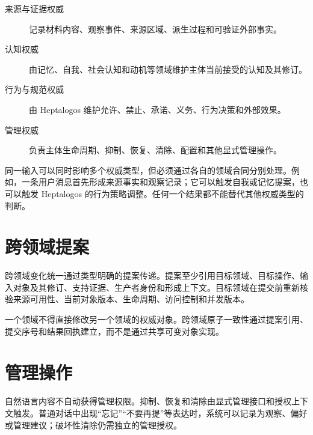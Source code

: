 \begin{description}
\item[来源与证据权威] 记录材料内容、观察事件、来源区域、派生过程和可验证外部事实。
\item[认知权威] 由记忆、自我、社会认知和动机等领域维护主体当前接受的认知及其修订。
\item[行为与规范权威] 由 Heptalogos 维护允许、禁止、承诺、义务、行为决策和外部效果。
\item[管理权威] 负责主体生命周期、抑制、恢复、清除、配置和其他显式管理操作。
\end{description}

同一输入可以同时影响多个权威类型，但必须通过各自的领域合同分别处理。例如，一条用户消息首先形成来源事实和观察记录；它可以触发自我或记忆提案，也可以触发 Heptalogos 的行为策略调整。任何一个结果都不能替代其他权威类型的判断。

\section{跨领域提案}

跨领域变化统一通过类型明确的提案传递。提案至少引用目标领域、目标操作、输入对象及其修订、支持证据、生产者身份和形成上下文。目标领域在提交前重新核验来源可用性、当前对象版本、生命周期、访问控制和并发版本。

一个领域不得直接修改另一个领域的权威对象。跨领域原子一致性通过提案引用、提交序号和结果回执建立，而不是通过共享可变对象实现。

\section{管理操作}

自然语言内容不自动获得管理权限。抑制、恢复和清除由显式管理接口和授权上下文触发。普通对话中出现“忘记”“不要再提”等表达时，系统可以记录为观察、偏好或管理建议；破坏性清除仍需独立的管理授权。
